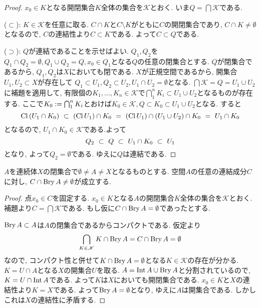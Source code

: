 \documentclass[uplatex, dvipdfmx, a4paper, 12pt, class=jsbook, crop=false]{standalone}
\begin{document}
\begin{proof}
	$ x_0 \in K $となる開閉集合$ K $全体の集合を$ \mathscr{K} $とおく. いま$ Q  = \bigcap \mathscr{K}$である.

	($ \subset $): $ K \in \mathscr{K} $を任意に取る.
	$ C \cap K $と$ C \setminus K $がともに$ C $の開閉集合であり,
	$ C \cap K \neq \emptyset $となるので, $ C $の連結性より$ C \subset K $である.
	よって$ C \subset Q $である.

	($ \supset $): $ Q $が連結であることを示せばよい.
	$ Q_1, Q_2 $を$ Q_1 \cap Q_2 = \emptyset, Q_1 \cup Q_2 = Q , x_0 \in Q_1$となる$ Q $の任意の閉集合とする.
	$ Q $が閉集合であるから, $ Q_1, Q_2 $は$ X $においても閉である.
	$ X $が正規空間であるから, 開集合$ U_1, U_2 \subset X $が存在して
	$ Q_1 \subset U_1, Q_2 \subset U_2, U_1 \cap U_2 = \emptyset $となる.
	$\bigcap \mathscr{K} = Q = U_1 \cup U_2 $に補題を適用して,
	有限個の$ K_1 , \ldots, K_n \in \mathscr{K}$で$ \bigcap_{1}^{n} K_i \subset U_1 \cup U_2$となるものが存在する.
	ここで$ K_0 \mathrel{:=} \bigcap_{1}^{n} K_i$とおけば$ K_0 \in \mathscr{K}, Q \subset K_0 \subset U_1 \cup U_2 $となる.
	すると
	\[ \mathop{\mathrm{Cl}}\nolimits\left( U_1 \cap K_0 \right) \ \subset\  \left(\mathop{\mathrm{Cl}}\nolimits U_1 \right) \cap K_0
	\ =\  \left(\mathop{\mathrm{Cl}}\nolimits U_1 \right) \cap (U_1 \cup U_2) \cap K_0 \ =\  U_1 \cap K_0\]
	となるので, $ U_1 \cap K_0 \in \mathscr{K} $である.よって
	\[ Q_2 \ \subset\  Q \ \subset\  U_1 \cap K_0 \ \subset\  U_1 \]
	となり, よって$ Q_2 = \emptyset $である. ゆえに$ Q $は連結である.
\end{proof}

\begin{lemma}
	$ A $を連続体$ X $の閉集合で$ \emptyset \neq A \neq X $となるものとする.
	空間$ A $の任意の連結成分$ C $に対し, $ C \cap \mathop{\mathrm{Bry}}\nolimits A \neq \emptyset $が成立する.
\end{lemma}

\begin{proof}
	点$ x_0 \in C $を固定する. $ x_0 \in K $となる$ A $の開閉集合$ K $全体の集合を$ \mathscr{K} $とおく.
	補題より$ C = \bigcap \mathscr{K} $である. もし仮に$ C \cap \mathop{\mathrm{Bry}}\nolimits A = \emptyset $であったとする.

	$ \mathop{\mathrm{Bry}}\nolimits A \subset A $は$ A $の閉集合であるからコンパクトである. 仮定より
	\[ \bigcap_{K \in \mathscr{K}} K \cap \mathop{\mathrm{Bry}}\nolimits A = C \cap \mathop{\mathrm{Bry}}\nolimits A = \emptyset \]
	なので, コンパクト性と併せて$ K \cap \mathop{\mathrm{Bry}}\nolimits A = \emptyset $となる$ K \in \mathscr{K} $の存在が分かる.
	$ K = U \cap A  $となる$ X $の開集合$ U $を取る. $ A = \mathop{\mathrm{Int}}\nolimits A \cup \mathop{\mathrm{Bry}}\nolimits A $と分割されているので,
	$ K = U \cap \mathop{\mathrm{Int}}\nolimits A $である. よって$ K $は$ X $においても開閉集合である.
	$x_0 \in K $と$ X $の連結性より$ K = X $である.
	よって$ \mathop{\mathrm{Bry}}\nolimits A = \emptyset $となり, ゆえに$ A $は開集合である. しかしこれは$ X $の連結性に矛盾する.
\end{proof}
\end{document}
